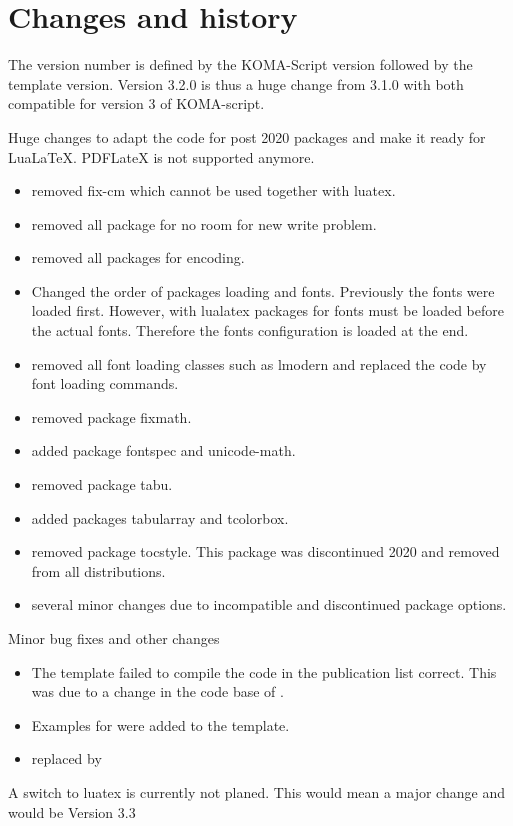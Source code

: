 
\chapter{Changes and history}
\label{appendix:doc:changes}

The version number is defined by the KOMA-Script version followed by the template version. 
Version 3.2.0 is thus a huge change from 3.1.0 with both compatible for version 3 of KOMA-script.

Huge changes to adapt the code for post 2020 packages and make it ready for LuaLaTeX. PDFLateX is not supported anymore.
\begin{itemize}
	\item removed fix-cm which cannot be used together with luatex.
	\item removed all package for no room for new write problem.
	\item removed all packages for encoding.
	\item Changed the order of packages loading and fonts. Previously the fonts were loaded first.
	However, with lualatex packages for fonts must be loaded before the actual fonts. Therefore the fonts configuration is loaded at the end.
	\item removed all font loading classes such as lmodern and replaced the code by font loading commands.
	\item removed package fixmath.
	\item added package fontspec and unicode-math.
	\item removed package tabu.
	\item added packages tabularray and tcolorbox.
	\item removed package tocstyle. This package was discontinued 2020 and removed from all distributions.
	\item several minor changes due to incompatible and discontinued package options.
\end{itemize}


Minor bug fixes and other changes
\begin{itemize}
	\item The template failed to compile the  code in the publication list correct. This was due to a change in the code base of .
	\item Examples for  were added to the template.
	\item replaced  by 
\end{itemize}
A switch to luatex is currently not planed. This would mean a major change and would be Version 3.3

